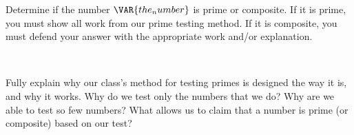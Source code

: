 
Determine if the number $\VAR{the_number}$ is prime or composite. If it is prime, you must show all work from our prime testing method. If it is composite, you must defend your answer with the appropriate work and/or explanation.\\

\begin{ansenv}
    \\

\end{ansenv}

\newpage


Fully explain why our class's method for testing primes is designed the way it is, and why it works. Why do we test only the numbers that we do? Why are we able to test so few numbers? What allows us to claim that a number is prime (or composite) based on our test?



